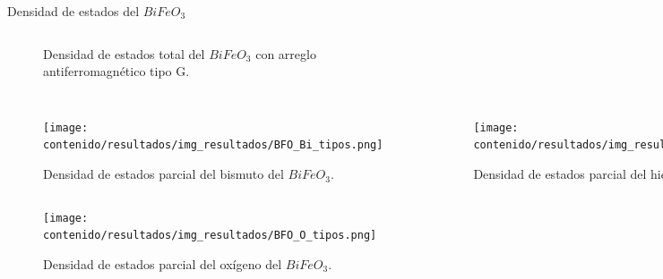\begin{frame}{Densidad de estados del $BiFeO_{3}$}
\begin{columns}[t]
\begin{figure}[H]
        \caption{Densidad de estados total del $BiFeO_{3}$ con arreglo 
            antiferromagn\'etico tipo G.}
    \end{figure}
\end{columns}           
\end{frame}

\begin{frame}
    \begin{columns}[t]
        \begin{figure}[H]
            \centering
            \texttt{[image: contenido/resultados/img\_resultados/BFO\_Bi\_tipos.png]}
            \caption{Densidad de estados parcial del bismuto del $BiFeO_{3}$.}
        \end{figure}
        \begin{figure}[H]
            \centering
            \texttt{[image: contenido/resultados/img\_resultados/BFO\_Fe\_tipos.png]}
            \caption{Densidad de estados parcial del hierro del $BiFeO_{3}$.}
        \end{figure}
    \end{columns}
\end{frame}

\begin{frame}
     \begin{figure}[H]
        \centering
        \texttt{[image: contenido/resultados/img\_resultados/BFO\_O\_tipos.png]}
        \caption{Densidad de estados parcial del ox\'igeno del $BiFeO_{3}$.}
    \end{figure}
\end{frame}